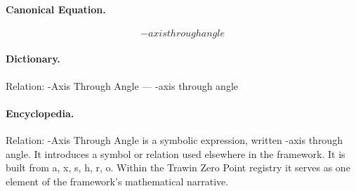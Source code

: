 \paragraph{Canonical Equation.}
\[
-axis through angle
\]

\paragraph{Dictionary.}
Relation: -Axis Through Angle — -axis through angle

\paragraph{Encyclopedia.}
Relation: -Axis Through Angle is a symbolic expression, written -axis through angle. It introduces a symbol or relation used elsewhere in the framework. It is built from a, x, s, h, r, o. Within the Trawin Zero Point registry it serves as one element of the framework's mathematical narrative.
